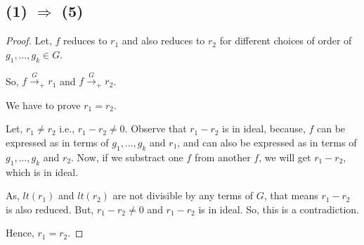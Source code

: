 \subsection{(1) $\Longrightarrow$ (5)}
\begin{proof}
Let, $f$ reduces to $r_1$ and also reduces to $r_2$ for different choices of order of $g_1, \ldots ,g_k \in G$.

So, $ f {\mathop \rightarrow \limits^{G}}_+ r_1$ and $ f {\mathop \rightarrow \limits^{G}}_+ r_2$.

We have to prove $r_1 = r_2$.

Let, $r_1 \neq r_2$ i.e., $r_1 - r_2 \neq 0$.
Observe that $r_1 - r_2$ is in ideal, because, $f$ can be expressed as in terms of $g_1, \ldots ,g_k$ and $r_1$, and can also be expressed as in terms of $g_1, \ldots ,g_k$ and $r_2$. Now, if we substract one $f$ from another $f$, we will get $r_1 - r_2$, which is in ideal.

As, $lt(r_1)$ and $lt(r_2)$ are not divisible by any terms of $G$, that means $r_1 - r_2$ is also reduced. But, $r_1 - r_2 \neq 0$ and $r_1 - r_2$ is in ideal. So, this is a contradiction.

Hence, $r_1 = r_2$.
\end{proof}

